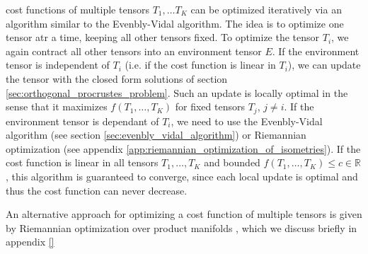 cost functions of multiple tensors $T_1, \dots T_K$ can be optimized iteratively via an algorithm similar to the Evenbly-Vidal algorithm. The idea is to optimize one tensor atr a time, keeping all other tensors fixed. To optimize the tensor $T_i$, we again contract all other tensors into an environment tensor $E$. If the environment tensor is independent of $T_i$ (i.e. if the cost function is linear in $T_i$), we can update the tensor with the closed form solutions of section \ref{sec:orthogonal_procrustes_problem}. Such an update is locally optimal in the sense that it maximizes $f(T_1, \dots, T_K)$ for fixed tensors $T_j$, $j\neq i$. If the environment tensor is dependant of $T_i$, we need to use the Evenbly-Vidal algorithm (see section \ref{sec:evenbly_vidal_algorithm}) or Riemannian optimization (see appendix \ref{app:riemannian_optimization_of_isometries}). If the cost function is linear in all tensors $T_1, \dots, T_K$ and bounded $f(T_1, \dots, T_K) \le c\in\mathbb{R}$, this algorithm is guaranteed to converge, since each local update is optimal and thus the cost function can never decrease. \par
An alternative approach for optimizing a cost function of multiple tensors is given by Riemannian optimization over product manifolds \cite{cite:riemannian_optimization_isometric_tensor_networks}, which we discuss briefly in appendix \ref{} 